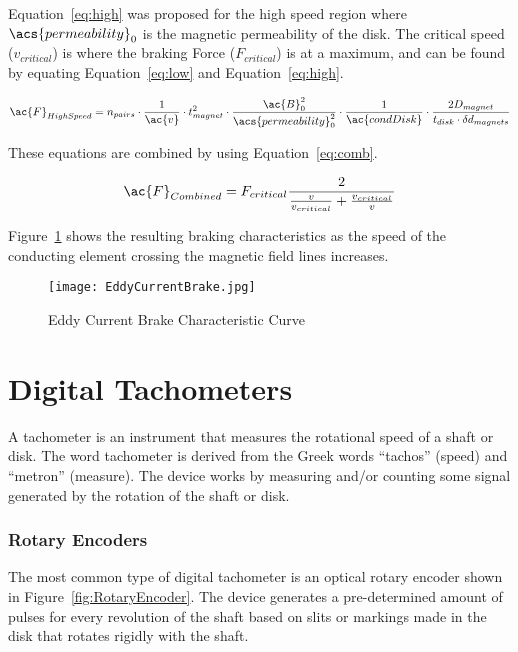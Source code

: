 Equation~\ref{eq:high} was proposed for the high speed region where $\acs{permeability}_0$ is the magnetic permeability of the disk. The critical speed ($v_{critical}$) is  where the braking Force ($F_{critical}$) is at a maximum, and can be found by equating Equation~\ref{eq:low} and Equation~\ref{eq:high}.

\begin{equation}
	\ac{F}_{High Speed} = n_{pairs} \cdot \frac{1}{\ac{v}} \cdot t_{magnet}^2 \cdot \frac{\ac{B}_0^2}{\acs{permeability}_0^2} \cdot \frac{1}{\ac{condDisk}} \cdot \frac{2 D_{magnet}}{t_{disk} \cdot \delta d_{magnets}}
	\label{eq:high}
\end{equation}

These equations are combined by using Equation~\ref{eq:comb}. 

\begin{equation}
	\ac{F}_{Combined} = F_{critical} \frac{2}{\frac{v}{v_{critical}} + \frac{v_{critical}}{v}}
	\label{eq:comb}
\end{equation}

Figure~\ref{fig:EddyCurrentBrakeProfile} shows the resulting braking characteristics as the speed of the conducting  element crossing the magnetic field lines increases.

\begin{figure}[H]
	\begin{center}
		\texttt{[image: EddyCurrentBrake.jpg]}
		\caption{Eddy Current Brake Characteristic Curve}
		\label{fig:EddyCurrentBrakeProfile}
	\end{center}
\end{figure}

\section{Digital Tachometers}
A tachometer is an instrument that measures the rotational speed of a shaft or disk. The word tachometer is derived from the Greek words ``tachos'' (speed) and ``metron'' (measure). The device works by measuring and/or counting some signal generated by the rotation of the shaft or disk. \citep{analogic:2018} 

\subsubsection{Rotary Encoders}

The most common type of digital tachometer is an optical rotary encoder shown in Figure~\ref{fig:RotaryEncoder}. The device generates a pre-determined amount of pulses for every revolution of the shaft based on slits or markings made in the disk that rotates rigidly with the shaft.

